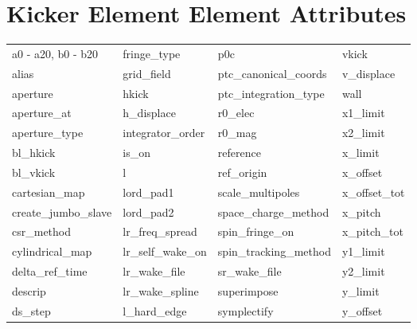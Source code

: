  \vfill
 
 \section{Kicker Element Element Attributes}
 \label{s:list.kicker}
 
 \begin{tabular}{llll} \toprule
a0 - a20, b0 - b20          & fringe_type                 & p0c                         & vkick                       \\
alias                       & grid_field                  & ptc_canonical_coords        & v_displace                  \\
aperture                    & hkick                       & ptc_integration_type        & wall                        \\
aperture_at                 & h_displace                  & r0_elec                     & x1_limit                    \\
aperture_type               & integrator_order            & r0_mag                      & x2_limit                    \\
bl_hkick                    & is_on                       & reference                   & x_limit                     \\
bl_vkick                    & l                           & ref_origin                  & x_offset                    \\
cartesian_map               & lord_pad1                   & scale_multipoles            & x_offset_tot                \\
create_jumbo_slave          & lord_pad2                   & space_charge_method         & x_pitch                     \\
csr_method                  & lr_freq_spread              & spin_fringe_on              & x_pitch_tot                 \\
cylindrical_map             & lr_self_wake_on             & spin_tracking_method        & y1_limit                    \\
delta_ref_time              & lr_wake_file                & sr_wake_file                & y2_limit                    \\
descrip                     & lr_wake_spline              & superimpose                 & y_limit                     \\
ds_step                     & l_hard_edge                 & symplectify                 & y_offset                    \\

\end{tabular}
